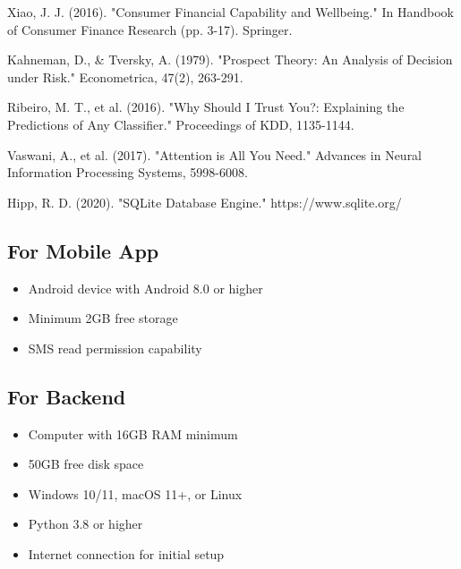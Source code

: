 \documentclass[11pt,a4paper]{report}
\begin{document}
\begin{itemize}
\begin{thebibliography}{99}
Xiao, J. J. (2016). "Consumer Financial Capability and Wellbeing." In Handbook of Consumer Finance Research (pp. 3-17). Springer.

Kahneman, D., \& Tversky, A. (1979). "Prospect Theory: An Analysis of Decision under Risk." Econometrica, 47(2), 263-291.

Ribeiro, M. T., et al. (2016). "Why Should I Trust You?: Explaining the Predictions of Any Classifier." Proceedings of KDD, 1135-1144.

Vaswani, A., et al. (2017). "Attention is All You Need." Advances in Neural Information Processing Systems, 5998-6008.

Hipp, R. D. (2020). "SQLite Database Engine." https://www.sqlite.org/

\end{thebibliography}




\subsection{For Mobile App}
\begin{itemize}
    \item Android device with Android 8.0 or higher
    \item Minimum 2GB free storage
    \item SMS read permission capability
\end{itemize}

\subsection{For Backend}
\begin{itemize}
    \item Computer with 16GB RAM minimum
    \item 50GB free disk space
    \item Windows 10/11, macOS 11+, or Linux
    \item Python 3.8 or higher
    \item Internet connection for initial setup
\end{itemize}


\end{itemize}
\end{document}
